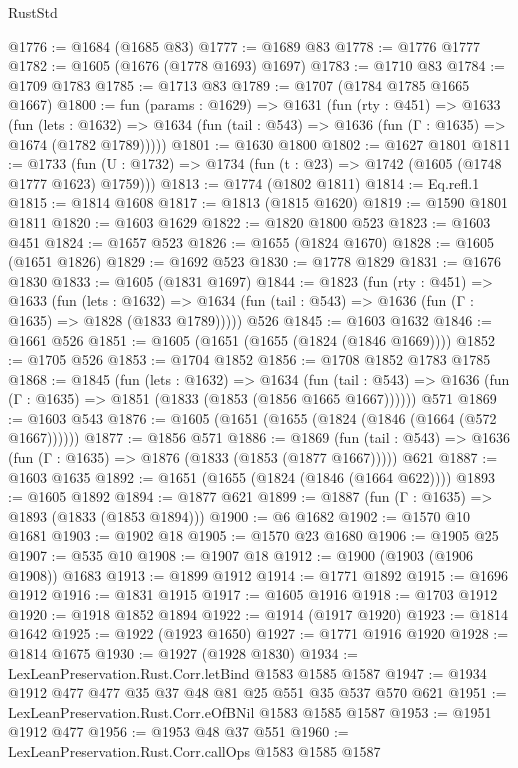 \begin{lexlean}{RustStd}
\begin{coremodule}
{\begin{coremodule}
{{{{{{{{{{{{{{@1776 := @1684 (@1685 @83)
@1777 := @1689 @83
@1778 := @1776 @1777
@1782 := @1605 (@1676 (@1778 @1693) @1697)
@1783 := @1710 @83
@1784 := @1709 @1783
@1785 := @1713 @83
@1789 := @1707 (@1784 @1785 @1665 @1667)
@1800 := fun (params : @1629) =>
  @1631
    (fun (rty : @451) =>
    @1633
      (fun (lets : @1632) =>
      @1634 (fun (tail : @543) => @1636 (fun (Γ : @1635) => @1674 (@1782 @1789)))))
@1801 := @1630 @1800
@1802 := @1627 @1801
@1811 := @1733 (fun (U : @1732) => @1734 (fun (t : @23) => @1742 (@1605 (@1748 @1777 @1623) @1759)))
@1813 := @1774 (@1802 @1811)
@1814 := Eq.refl.{1}
@1815 := @1814 @1608
@1817 := @1813 (@1815 @1620)
@1819 := @1590 @1801 @1811
@1820 := @1603 @1629
@1822 := @1820 @1800 @523
@1823 := @1603 @451
@1824 := @1657 @523
@1826 := @1655 (@1824 @1670)
@1828 := @1605 (@1651 @1826)
@1829 := @1692 @523
@1830 := @1778 @1829
@1831 := @1676 @1830
@1833 := @1605 (@1831 @1697)
@1844 := @1823
    (fun (rty : @451) =>
    @1633
      (fun (lets : @1632) =>
      @1634 (fun (tail : @543) => @1636 (fun (Γ : @1635) => @1828 (@1833 @1789)))))
    @526
@1845 := @1603 @1632
@1846 := @1661 @526
@1851 := @1605 (@1651 (@1655 (@1824 (@1846 @1669))))
@1852 := @1705 @526
@1853 := @1704 @1852
@1856 := @1708 @1852 @1783 @1785
@1868 := @1845
    (fun (lets : @1632) =>
    @1634
      (fun (tail : @543) => @1636 (fun (Γ : @1635) => @1851 (@1833 (@1853 (@1856 @1665 @1667))))))
    @571
@1869 := @1603 @543
@1876 := @1605 (@1651 (@1655 (@1824 (@1846 (@1664 (@572 @1667))))))
@1877 := @1856 @571
@1886 := @1869
    (fun (tail : @543) => @1636 (fun (Γ : @1635) => @1876 (@1833 (@1853 (@1877 @1667)))))
    @621
@1887 := @1603 @1635
@1892 := @1651 (@1655 (@1824 (@1846 (@1664 @622))))
@1893 := @1605 @1892
@1894 := @1877 @621
@1899 := @1887 (fun (Γ : @1635) => @1893 (@1833 (@1853 @1894)))
@1900 := @6 @1682
@1902 := @1570 @10 @1681
@1903 := @1902 @18
@1905 := @1570 @23 @1680
@1906 := @1905 @25
@1907 := @535 @10
@1908 := @1907 @18
@1912 := @1900 (@1903 (@1906 @1908)) @1683
@1913 := @1899 @1912
@1914 := @1771 @1892
@1915 := @1696 @1912
@1916 := @1831 @1915
@1917 := @1605 @1916
@1918 := @1703 @1912
@1920 := @1918 @1852 @1894
@1922 := @1914 (@1917 @1920)
@1923 := @1814 @1642
@1925 := @1922 (@1923 @1650)
@1927 := @1771 @1916 @1920
@1928 := @1814 @1675
@1930 := @1927 (@1928 @1830)
@1934 := LexLeanPreservation.Rust.Corr.letBind @1583 @1585 @1587
@1947 := @1934 @1912 @477 @477 @35 @37 @48 @81 @25 @551 @35 @537 @570 @621
@1951 := LexLeanPreservation.Rust.Corr.eOfBNil @1583 @1585 @1587
@1953 := @1951 @1912 @477
@1956 := @1953 @48 @37 @551
@1960 := LexLeanPreservation.Rust.Corr.callOps @1583 @1585 @1587
}}}}}}}}}}}}}}
\end{coremodule}}
\end{coremodule}
\end{lexlean}
